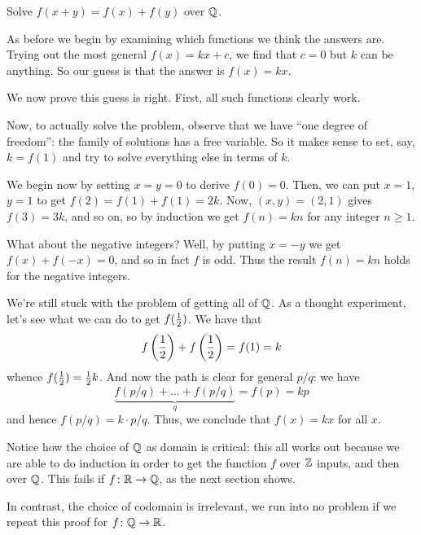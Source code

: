 \documentclass[11pt]{scrartcl}
\begin{document}
\begin{example}
  Solve $f(x+y) = f(x) + f(y)$ over $\mathbb Q$.
\end{example}
\begin{soln}
  As before we begin by examining which
  functions we think the answers are.
  Trying out the most general $f(x) = kx+c$,
  we find that $c=0$ but $k$ can be anything.
  So our guess is that the answer is $f(x) = kx$.

  We now prove this guess is right. First, all such functions clearly work.

  Now, to actually solve the problem,
  observe that we have ``one degree of freedom'':
  the family of solutions has a free variable.
  So it makes sense to set, say, $k = f(1)$
  and try to solve everything else in terms of $k$.

  We begin now by setting $x=y=0$ to derive $f(0) = 0$.
  Then, we can put $x=1$, $y=1$ to get $f(2) = f(1)+f(1) = 2k$.
  Now, $(x,y) = (2,1)$ gives $f(3) = 3k$, and so on,
  so by induction we get $f(n) = kn$ for any integer $n \ge 1$.

  What about the negative integers?
  Well, by putting $x=-y$ we get $f(x) + f(-x) = 0$, and so in fact $f$ is odd.
  Thus the result $f(n) = kn$ holds for the negative integers.

  We're still stuck with the problem of getting all of $\mathbb Q$.
  As a thought experiment, let's see what we can do to get $f(\frac{1}{2})$.
  We have that
  \[ f\left(\frac{1}{2}\right) + f\left(\frac{1}{2}\right) = f(1) = k \]
  whence $f(\frac{1}{2}) = \frac{1}{2} k$.
  And now the path is clear for general $p/q$: we have
  \[ \underbrace{f(p/q) + \dots + f(p/q)}_q = f(p) = kp \]
  and hence $f(p/q) = k \cdot p/q$.
  Thus, we conclude that $f(x) = kx$ for all $x$.
\end{soln}

\begin{remark}
Notice how the choice of $\mathbb Q$ as domain is critical:
this all works out because we are able to do induction
in order to get the function $f$ over $\mathbb Z$ inputs,
and then over $\mathbb Q$.
This fails if $f \colon \mathbb R \to \mathbb Q$, as the next section shows.

In contrast, the choice of codomain is irrelevant,
we run into no problem if we repeat this proof for $f \colon \mathbb Q \to \mathbb R$.
\end{remark}
\end{document}
